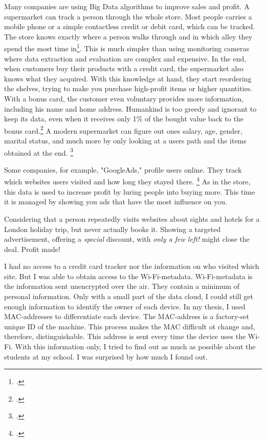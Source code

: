 \documentclass[paper=a4, fontsize=11pt]{article}
\begin{document}
Many companies are using Big Data algorithms to improve sales and profit. A supermarket can track a person through the whole store.
Most people carries a mobile phone or a simple contactless credit or debit card, which can be tracked. The store knows exactly where a person walks through and in which alley they spend the most time in\footcite{supermarkettracking}. This is much simpler than using monitoring cameras where data extraction and evaluation are complex and expensive. In the end, when customers buy their products with a credit card, the supermarket also knows what they acquired. With this knowledge at hand, they start reordering the shelves, trying to make you purchase high-profit items or higher quantities. With a bonus card, the customer even voluntary provides more information, including his name and home address. Humankind is too greedy and ignorant to keep its data, even when it receives only 1\% of the bought value back to the bonus card.\footcite{supermarketpoints} A modern supermarket can figure out ones salary, age, gender, marital status, and much more by only looking at a users path and the items obtained at the end. \footcite{supermarketbigdata}

Some companies, for example, "GoogleAds," profile users online. They track which websites users visited and how long they stayed there. \footcite{googleadshow} As in the store, this data is used to increase profit by luring people into buying more. This time it is managed by showing you ads that have the most influence on you. 

Considering that a person repeatedly visits websites about sights and hotels for a London holiday trip, but never actually books it. Showing a targeted advertisement, offering a \emph{special} discount, with \emph{only a few left!} might close the deal. Profit made!

I had no access to a credit card tracker nor the information on who visited which site. But I was able to obtain access to the Wi-Fi-metadata. Wi-Fi-metadata is the information sent unencrypted over the air. They contain a minimum of personal information. Only with a small part of the data cloud, I could still get enough information to identify the owner of each device. In my thesis, I used MAC-addresses to differentiate each device. The MAC-address is a factory-set unique ID of the machine. This process makes the MAC difficult ot change and, therefore, distinguishable. This address is sent every time the device uses the Wi-Fi. With this information only, I tried to find out as much as possible about the students at my school. I was surprised by how much I found out.
\end{document}
